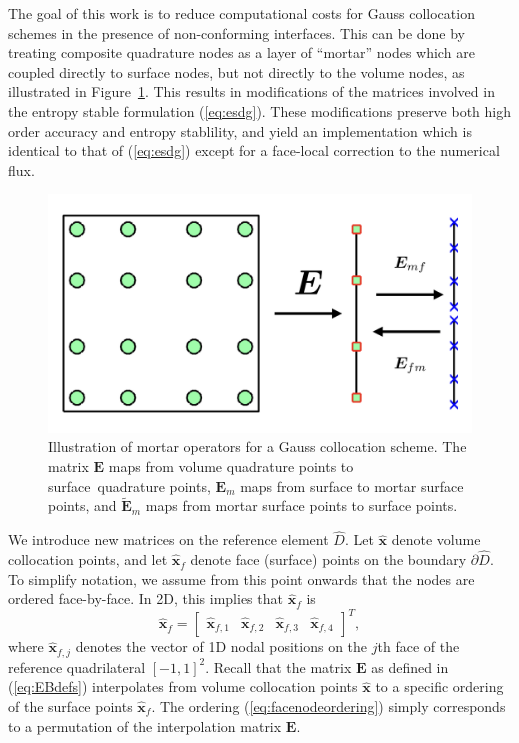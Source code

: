 \documentclass{svjour3}                     %
\renewcommand{\hat}{\widehat}
\renewcommand{\tilde}{\widetilde}
\begin{document}
The goal of this work is to reduce computational costs for Gauss collocation schemes in the presence of non-conforming interfaces.  This can be done by treating composite quadrature nodes as a layer of ``mortar'' nodes which are coupled directly to surface nodes, but not directly to the volume nodes, as illustrated in Figure~\ref{fig:gqcon_noncon}.  This results in modifications of the matrices involved in the entropy stable formulation (\ref{eq:esdg}).  These modifications preserve both high order accuracy and entropy stablility, and yield an implementation which is identical to that of (\ref{eq:esdg}) except for a face-local correction to the numerical flux.  
\begin{figure}
\centering
\includegraphics[width=.6\textwidth]{figs/mortar.png}
\caption{Illustration of mortar operators for a Gauss collocation scheme.  The matrix $\bm{E}$ maps from volume quadrature points to surface quadrature points, $\bm{E}_m$ maps from surface to mortar surface points, and $\tilde{\bm{E}}_m$ maps from mortar surface points to surface points. }
\label{fig:gqcon_noncon}
\end{figure}

We introduce new matrices on the reference element $\hat{D}$.  Let $\hat{\bm{x}}$ denote volume collocation points, and let $\hat{\bm{x}}_f$ denote face (surface) points on the boundary $\partial \hat{D}$.  To simplify notation, we assume from this point onwards that the nodes are ordered face-by-face.  In 2D, this implies that $\hat{\bm{x}}_f$ is 
\begin{equation}
\hat{\bm{x}}_f = \begin{bmatrix}
\hat{\bm{x}}_{f,1} &
\hat{\bm{x}}_{f,2} &
\hat{\bm{x}}_{f,3} &
\hat{\bm{x}}_{f,4}
\end{bmatrix}^T,
\label{eq:facenodeordering}
\end{equation}
where $\hat{\bm{x}}_{f,j}$ denotes the vector of 1D nodal positions on the $j$th face of the reference quadrilateral $[-1,1]^2$.  Recall that the matrix $\bm{E}$ as defined in (\ref{eq:EBdefs}) interpolates from volume collocation points $\hat{\bm{x}}$ to a specific ordering of the surface points $\hat{\bm{x}}_f$.  The ordering (\ref{eq:facenodeordering}) simply corresponds to a permutation of the interpolation matrix $\bm{E}$.  
\end{document}
